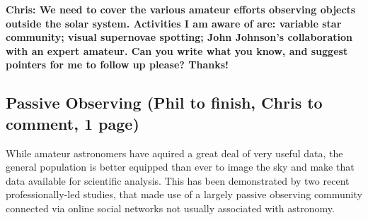 \documentclass{ar2e}
\begin{document}
{\bf Chris: We need to cover the various amateur efforts observing objects
outside the solar system. Activities I am aware of are: variable star
community; visual supernovae spotting; John Johnson's collaboration with an
expert amateur. Can you write what you know, and suggest pointers for me to
follow up please? Thanks!}







% 
% 



\subsection{Passive Observing (Phil to finish, Chris to comment, 1 page)}
\label{sec:obs:passive}

While amateur astronomers have aquired a great deal of very useful data, the
general population is better equipped than ever to image the sky and make that
data available for scientific analysis. This has been demonstrated by two
recent professionally-led studies, that made use of a largely passive
observing community connected via online social networks not usually
associated with astronomy. 
\end{document}
